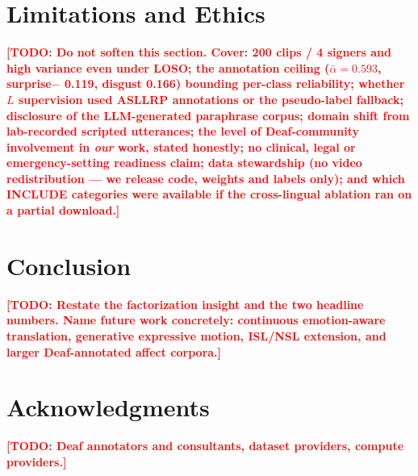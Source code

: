 \documentclass[conference]{IEEEtran}
\newcommand{\TODO}[1]{\textcolor{red}{\textbf{[TODO: #1]}}}
\begin{document}
\section{Limitations and Ethics}
\label{sec:ethics}
\TODO{Do not soften this section. Cover: 200 clips / 4 signers and high variance even under LOSO;
the annotation ceiling ($\bar\alpha=0.593$, surprise$-$ 0.119, disgust 0.166) bounding per-class
reliability; whether $L$ supervision used ASLLRP annotations or the pseudo-label fallback;
disclosure of the LLM-generated paraphrase corpus; domain shift from lab-recorded scripted
utterances; the level of Deaf-community involvement in \emph{our} work, stated honestly; no
clinical, legal or emergency-setting readiness claim; data stewardship (no video redistribution ---
we release code, weights and labels only); and which INCLUDE categories were available if the
cross-lingual ablation ran on a partial download.}

\section{Conclusion}
\label{sec:conclusion}
\TODO{Restate the factorization insight and the two headline numbers. Name future work concretely:
continuous emotion-aware translation, generative expressive motion, ISL/NSL extension, and larger
Deaf-annotated affect corpora.}

\section*{Acknowledgments}
\TODO{Deaf annotators and consultants, dataset providers, compute providers.}



\end{document}
